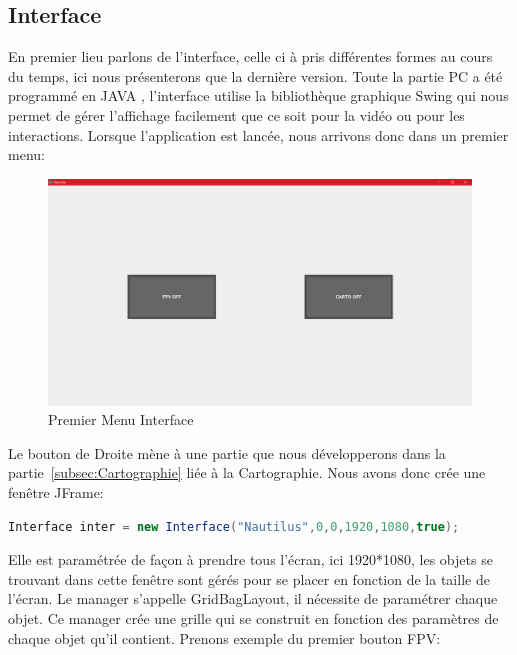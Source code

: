 \documentclass[a4paper,11pt]{report}
\begin{document}
		\subsection{Interface}
			En premier lieu parlons de l'interface, celle ci à pris différentes formes au cours du temps, ici nous présenterons que la dernière version. Toute la partie PC a été programmé en JAVA \cite{ref4}, l'interface utilise la bibliothèque graphique Swing qui nous permet de gérer l'affichage facilement que ce soit pour la vidéo ou pour les interactions.
			Lorsque l'application est lancée, nous arrivons donc dans un premier menu:
			\begin{figure}[!h]
					\begin{center}
						\includegraphics[scale=0.35]{Photos/Interface1.png}
						\caption{Premier Menu Interface}
					\end{center}
				\end{figure}
				\newline Le bouton de Droite mène à une partie que nous développerons dans la partie~\ref{subsec:Cartographie} liée à la Cartographie.
				\newline \newline Nous avons donc crée une fenêtre JFrame:
				\begin{lstlisting}[language=java]
Interface inter = new Interface("Nautilus",0,0,1920,1080,true);
				\end{lstlisting}
				Elle est paramétrée de façon à prendre tous l'écran, ici 1920*1080, les objets se trouvant dans cette fenêtre sont gérés pour se placer en fonction de la taille de l’écran.
				\newline Le manager s'appelle GridBagLayout, il nécessite de paramétrer chaque objet.
				Ce manager crée une grille qui se construit en fonction des paramètres de chaque objet qu'il contient.
				\newpage Prenons exemple du premier bouton FPV:
\end{document}
